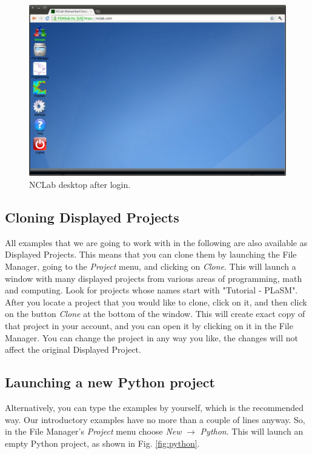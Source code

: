 \documentclass[article,A4,12pt]{llncs}
\begin{document}
\begin{figure}[!ht]
\begin{center}
\includegraphics[width=\textwidth]{img/desktop.png}
\end{center}
\caption{NCLab desktop after login.}
\label{fig:desktop}
\end{figure}

\subsection{Cloning Displayed Projects}

All examples that we are going to work with in the following are also available 
as Displayed Projects. This means that you can clone them by launching the File
Manager, going to the {\em Project} menu, and clicking on {\em Clone}. This will launch 
a window with many displayed projects from various areas of programming,
math and computing. Look for projects whose names start with "Tutorial - PLaSM".
After you locate a project that you would like to clone, click on it,
and then click on the button {\em Clone} at the bottom of the window. This will
create exact copy of that project in your account, and you can open it 
by clicking on it in the File Manager. You can change the project in any way 
you like, the changes will not affect the original Displayed Project. 


\subsection{Launching a new Python project}

Alternatively, you can type the examples by yourself, which is the 
recommended way. Our introductory examples have no more than 
a couple of lines anyway. So, in the File Manager's {\em Project} menu 
choose {\em New} $\rightarrow$ {\em Python}. This will launch an 
empty Python project, as shown in Fig. \ref{fig:python}.
\end{document}
